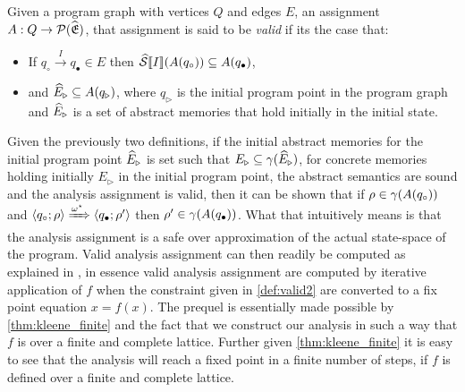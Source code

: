 \begin{definition}\label{def:valid2}
    Given a program graph with vertices $Q$ and edges $E$, an assignment $A : Q \rightarrow \mathcal{P}(\widehat{\mathfrak{E}})$, that assignment is said to be \emph{valid} if its the case that:
    \begin{itemize}
        \item If $q_\circ \xrightarrow{I} q_\bullet \in E$ then $\widehat{\mathcal{S}} \llbracket I \rrbracket(A(q_\circ)) \subseteq A(q_\bullet)$,
        \item and $\widehat{E}_\triangleright \subseteq A(q_\triangleright)$, where $q_\triangleright$ is the initial program point in the program graph and $\widehat{E}_\triangleright$ is a set of abstract memories that hold initially in the initial state.
    \end{itemize}
\end{definition}

Given the previously two definitions, if the initial abstract memories for the initial program point $\widehat{E}_\triangleright$ is set such that $E_{\triangleright} \subseteq \gamma(\widehat{E}_\triangleright)$, for concrete memories holding initially $E_{\triangleright}$ in the initial program point, the abstract semantics are sound and the analysis assignment is valid, then it can be shown that if $\rho \in \gamma(A(q_\circ))$ and $\langle q_\circ; \rho \rangle \xRightarrow{\omega^\star} \langle q_\bullet; \rho' \rangle$ then $\rho' \in \gamma(A(q_\bullet))$.
What that intuitively means is that the analysis assignment is a safe over approximation of the actual state-space of the program.
Valid analysis assignment can then readily be computed as explained in \cite{nielson_formal_2019}, in essence valid analysis assignment are computed by iterative application of $f$ when the constraint given in \autoref{def:valid2} are converted to a fix point equation $x = f(x)$.
The prequel is essentially made possible by \autoref{thm:kleene_finite} and the fact that we construct our analysis in such a way that $f$ is over a finite and complete lattice.
Further given \autoref{thm:kleene_finite} it is easy to see that the analysis will reach a fixed point in a finite number of steps, if $f$ is defined over a finite and complete lattice.



